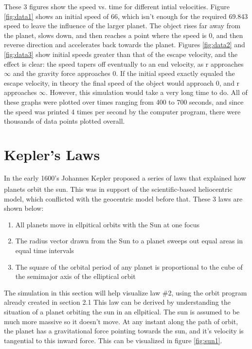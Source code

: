 These 3 figures show the speed vs. time for different intial velocities.  Figure \ref{fig:data1} shows an initial speed of 66, which isn't enough for the required 69.843 speed to leave the influence of the larger planet.  The object rises far away from the planet, slows down, and then reaches a point where the speed is 0, and then reverse direction and accelerates back towards the planet.  Figures \ref{fig:data2} and \ref{fig:data3} show initial speeds greater than that of the escape velocity, and the effect is clear: the speed tapers off eventually to an end velocity, as r approaches $\infty$ and the gravity force approaches 0.  If the initial speed exactly equaled the escape velocity, in theory the final speed of the object would approach 0, and r approaches $\infty$.  However, this simulation would take a very long time to do.  All of these graphs were plotted over times ranging from 400 to 700 seconds, and since the speed was printed 4 times per second by the computer program, there were thousands of data points plotted overall. 





\section{Kepler's Laws}




In the early 1600's Johannes Kepler proposed a series of laws that explained how planets orbit the sun.\textsuperscript{\cite{klepner}}  This was in support of the scientific-based heliocentric model, which conflicted with the geocentric model before that.  These 3 laws are shown below:



\begin{enumerate}
\item All planets move in ellpitical orbits with the Sun at one focus
\item The radius vector drawn from the Sun to a planet sweeps out equal areas in equal time intervals
\item The square of the orbital period of any planet is proportional to the cube of the semimajor axis of the elliptical orbit
\end{enumerate}

The simulation in this section will help visualize law \#2, using the orbit program already created in section 2.1  This law can be derived by understanding the situation of a planet orbiting the sun in an ellpitical.  The sun is assumed to be much more massive so it doesn't move.  At any instant along the path of orbit, the planet has a gravitational force pointing towards the sun, and it's velocity is tangential to this inward force.  This can be visualized in figure \ref{fig:sun1}.  

